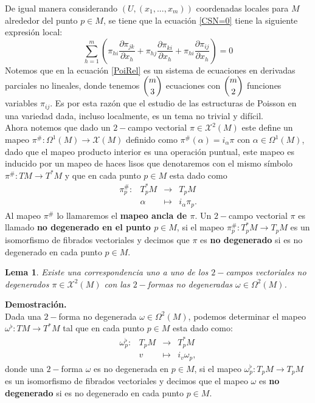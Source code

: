 \documentclass[a4paper,10pt]{book}
\newtheorem{lema}{Lema}[chapter]
\begin{document}
De igual manera considerando $(U,(x_{1},...,x_{m}))$ coordenadas locales para $M$ alrededor del punto $p\in M$, se tiene que la ecuaci\'on \ref{CSN=0} tiene la siguiente expresi\'on local:
\begin{equation}\label{PoiRel}
\sum_{h=1}^{m} \left( \pi_{hi}\frac{\partial\pi_{jk}}{\partial x_{h}} + \pi_{hj}\frac{\partial\pi_{ki}}{\partial x_{h}} + \pi_{hi}\frac{\partial\pi_{ij}}{\partial x_{h}} \right) = 0
\end{equation}
Notemos que en la ecuaci\'on \ref{PoiRel} es un sistema de ecuaciones en derivadas parciales no lineales, donde tenemos $\dbinom{m}{3}$ ecuaciones con $\dbinom{m}{2}$ funciones variables $\pi_{ij}$. Es por esta raz\'on que el estudio de las estructuras de Poisson en una variedad dada, incluso localmente, es un tema no trivial y dif\'icil.\\

Ahora notemos que dado un $2-$campo vectorial $\pi\in\mathcal{X}^{2}(M)$ este define un mapeo $\pi^{\#}:\Omega^{1}(M)\to\mathcal{X}(M)$ definido como $\pi^{\#}(\alpha)=i_{\alpha}\pi$ con $\alpha\in\Omega^{1}(M)$, dado que el mapeo producto interior es una operaci\'on puntual, este mapeo es inducido por un mapeo de haces lisos que denotaremos con el mismo s\'imbolo $\pi^{\#}:TM\to T^{*}M$ y que en cada punto $p\in M$ esta dado como 
\[\begin{array}{ccrl}
\pi_{p}^{\#} :& T_{p}^{*}M  & \to & T_{p}M \\
          & \alpha & \mapsto & i_{\alpha}\pi_{p}.
\end{array}\]
Al mapeo $\pi^{\#}$ lo llamaremos el {\bfseries mapeo ancla de $\pi$}. Un $2-$campo vectorial $\pi$ es llamado {\bfseries no degenerado en el punto $p\in M$}, si el mapeo $\pi_{p}^{\#}:T_{p}^{*}M\to T_{p}M$ es un isomorfismo de fibrados vectoriales y decimos que $\pi$ es {\bfseries no degenerado} si es no degenerado en cada punto $p\in M$.  
  
\begin{lema}\label{lema2.3.1}
Existe una correspondencia uno a uno de los $2-$campos vectoriales no degenerados $\pi\in\mathcal{X}^{2}(M)$ con las $2-$formas no degeneradas $\omega\in\Omega^{2}(M)$.  
\end{lema} 
 
{\bfseries Demostraci\'on.}\\
Dada una $2-$forma no degenerada $\omega\in\Omega^{2}(M)$, podemos determinar el mapeo $\omega^{\flat}:T M\to T^{*}M$ tal que en cada punto $p\in M$ esta dado como:    
\[\begin{array}{ccrl}
\omega_{p}^{\flat} :& T_{p}M  & \to & T_{p}^{*}M \\
          & v & \mapsto & i_{v}\omega_{p},
\end{array}\]
donde una $2-$forma $\omega$ es {no degenerada en $p\in M$}, si el mapeo $\omega_{p}^{\flat}:T_{p} M\to T_{p}M$ es un isomorfismo de fibrados vectoriales y decimos que el mapeo $\omega$ es {\bfseries no degenerado} si es no degenerado en cada punto $p\in M$.\\
\end{document}
